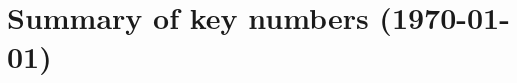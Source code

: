 \documentclass[11pt,a4paper,roman,english,colorlinks,linkcolor=true]{moderncv}
\begin{document}
\section{\textbf{Summary of key numbers (\today)}}
%	 
\end{document}
